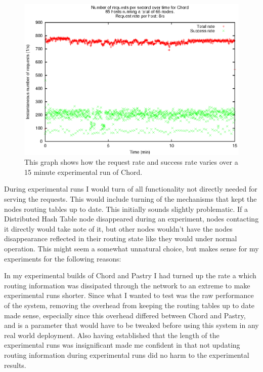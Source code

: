 \begin{figure}[!htb]
  \begin{center}
    \includegraphics[]{illustrations/rate_against_time_chord.eps}
    \caption{This graph shows how the request rate and success rate varies over a 15 minute experimental run of Chord.}
    \label{figRateAgainstTime}
  \end{center}
\end{figure}

During experimental runs I would turn of all functionality not directly needed for serving the requests. This would include turning of the mechanisms that kept the nodes routing tables up to date. This initially sounds slightly problematic. If a Distributed Hash Table node disappeared during an experiment, nodes contacting it directly would take note of it, but other nodes wouldn't have the nodes disappearance reflected in their routing state like they would under normal operation. This might seem a somewhat unnatural choice, but makes sense for my experiments for the following reasons:

In my experimental builds of Chord and Pastry I had turned up the rate a which routing information was dissipated through the network to an extreme to make experimental runs shorter. Since what I wanted to test was the raw performance of the system, removing the overhead from keeping the routing tables up to date made sense, especially since this overhead differed between Chord and Pastry, and is a parameter that would have to be tweaked before using this system in any real world deployment.
Also having established that the length of the experimental runs was insignificant made me confident in that not updating routing information during experimental runs did no harm to the experimental results.


